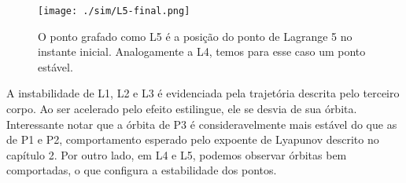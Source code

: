 \begin{figure}[!H]
\centering
\texttt{[image: ./sim/L5-final.png]}
\caption{O ponto grafado como L5 é a posição do ponto de Lagrange 5 no instante inicial. Analogamente a L4, temos para esse caso um ponto estável.}
\end{figure}

   A instabilidade de L1, L2 e L3 é evidenciada pela trajetória descrita pelo terceiro corpo. Ao ser acelerado pelo efeito estilingue, ele se desvia de sua órbita. Interessante notar que a órbita de P3 é consideravelmente mais estável do que as de P1 e P2, comportamento esperado pelo expoente de Lyapunov descrito no capítulo 2. Por outro lado, em L4 e L5, podemos observar órbitas bem comportadas, o que configura a estabilidade dos pontos.
